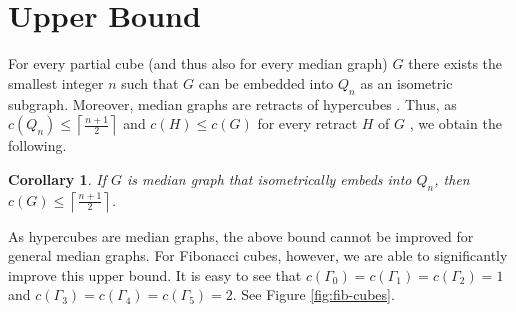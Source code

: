 \documentclass[11pt]{article}
\newtheorem{corollary}[theorem]{Corollary}
\newcommand{\ceil}[1]{\left\lceil #1 \right\rceil}
\newcommand{\vesna}[1]{{\bf \textcolor{green!60!black}{#1}}}
\newcommand{\nick}[1]{{\bf \textcolor{blue!60!black}{#1}}}
\begin{document}
\section{Upper Bound}
\label{sec:upper}

For every partial cube (and thus also for every median graph) $G$ there exists the smallest integer $n$ such that $G$ can be embedded into $Q_n$ as an isometric subgraph. Moreover, median graphs are retracts of hypercubes \cite{bandelt-2008}. Thus, as $c(Q_n) \leq \ceil{\frac{n+1}{2}}$ \cite{maamoun-1987} and $c(H) \leq c(G)$ for every retract $H$ of $G$ \cite{berarducci-1993}, we obtain the following.

\begin{corollary}
    \label{cor:hypercube}
    If $G$ is median graph that isometrically embeds into $Q_n$, then $c(G) \leq \ceil{\frac{n+1}{2}}$.
\end{corollary}

As hypercubes are median graphs, the above bound cannot be improved for general median graphs. For Fibonacci cubes, however, we are able to significantly improve this upper bound. It is easy to see that $c(\Gamma_0) = c(\Gamma_1) = c(\Gamma_2) = 1$ and $c(\Gamma_3) = c(\Gamma_4) = c(\Gamma_5) = 2$. See Figure \ref{fig:fib-cubes}. 
\end{document}
